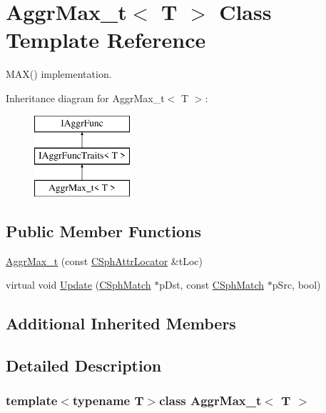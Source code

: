 \hypertarget{classAggrMax__t}{\section{Aggr\-Max\-\_\-t$<$ T $>$ Class Template Reference}
\label{classAggrMax__t}
}


M\-A\-X() implementation.  


Inheritance diagram for Aggr\-Max\-\_\-t$<$ T $>$\-:\begin{figure}[H]
\begin{center}
\leavevmode
\includegraphics[height=3.000000cm]{classAggrMax__t}
\end{center}
\end{figure}
\subsection*{Public Member Functions}
\begin{DoxyCompactItemize}
\item 
\hyperlink{classAggrMax__t_ab6f96845b7c6e94a901a1caa17294c7e}{Aggr\-Max\-\_\-t} (const \hyperlink{structCSphAttrLocator}{C\-Sph\-Attr\-Locator} \&t\-Loc)
\item 
virtual void \hyperlink{classAggrMax__t_a8dff1a626ff94baec7a06000cb631d2a}{Update} (\hyperlink{classCSphMatch}{C\-Sph\-Match} $\ast$p\-Dst, const \hyperlink{classCSphMatch}{C\-Sph\-Match} $\ast$p\-Src, bool)
\end{DoxyCompactItemize}
\subsection*{Additional Inherited Members}


\subsection{Detailed Description}
\subsubsection*{template$<$typename T$>$class Aggr\-Max\-\_\-t$<$ T $>$}

